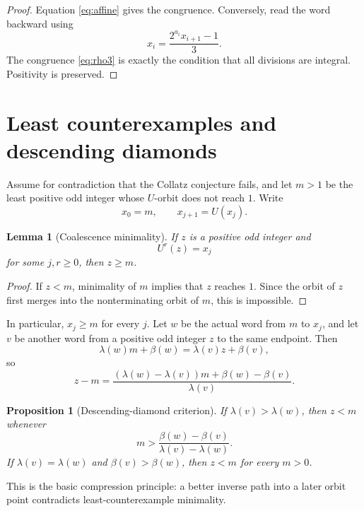\documentclass[11pt,reqno]{amsart}
\numberwithin{equation}{section}
\newtheorem{proposition}[theorem]{Proposition}
\newtheorem{lemma}[theorem]{Lemma}
\theoremstyle{definition}
\theoremstyle{remark}
\begin{document}
\begin{proof}
Equation \eqref{eq:affine} gives the congruence.  Conversely, read the word backward using
\[
 x_i=\frac{2^{a_i}x_{i+1}-1}{3}.
\]
The congruence \eqref{eq:rho3} is exactly the condition that all divisions are integral.  Positivity is preserved.
\end{proof}

\section{Least counterexamples and descending diamonds}\label{sec:diamonds}

Assume for contradiction that the Collatz conjecture fails, and let $m>1$ be the least positive odd integer whose $U$-orbit does not reach $1$.  Write
\[
 x_0=m,
 \qquad
 x_{j+1}=U(x_j).
\]

\begin{lemma}[Coalescence minimality]\label{lem:coalescence}
If $z$ is a positive odd integer and
\[
 U^r(z)=x_j
\]
for some $j,r\ge0$, then $z\ge m$.
\end{lemma}

\begin{proof}
If $z<m$, minimality of $m$ implies that $z$ reaches $1$.  Since the orbit of $z$ first merges into the nonterminating orbit of $m$, this is impossible.
\end{proof}

In particular, $x_j\ge m$ for every $j$.  Let $w$ be the actual word from $m$ to $x_j$, and let $v$ be another word from a positive odd integer $z$ to the same endpoint.  Then
\[
 \lambda(w)m+\beta(w)=\lambda(v)z+\beta(v),
\]
so
\begin{equation}\label{eq:diamond}
 z-m=
 \frac{(\lambda(w)-\lambda(v))m+\beta(w)-\beta(v)}{\lambda(v)}.
\end{equation}

\begin{proposition}[Descending-diamond criterion]\label{prop:diamond}
If $\lambda(v)>\lambda(w)$, then $z<m$ whenever
\begin{equation}\label{eq:diamondthreshold}
 m>
 \frac{\beta(w)-\beta(v)}{\lambda(v)-\lambda(w)}.
\end{equation}
If $\lambda(v)=\lambda(w)$ and $\beta(v)>\beta(w)$, then $z<m$ for every $m>0$.
\end{proposition}

This is the basic compression principle: a better inverse path into a later orbit point contradicts least-counterexample minimality.
\end{document}
